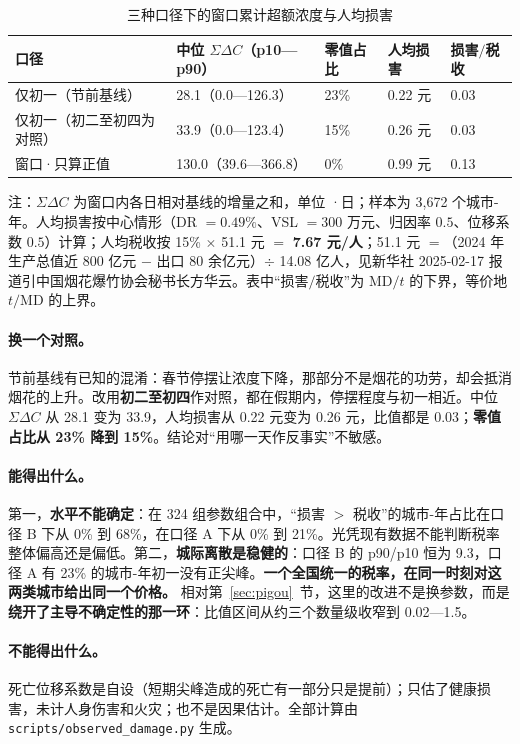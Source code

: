 \begin{table}[H]
\centering
\caption{三种口径下的窗口累计超额浓度与人均损害}
\label{tab:observed}
\small
\begin{tabular}{L{3.0cm}R{4.0cm}R{1.8cm}R{2.0cm}R{2.0cm}}
\toprule
\textbf{口径} & \textbf{中位 $\Sigma\Delta C$（p10—p90）} & \textbf{零值占比} & \textbf{人均损害} & \textbf{损害$/$税收} \\
\midrule
仅初一（节前基线） & 28.1（0.0—126.3） & 23\% & 0.22 元 & 0.03 \\
仅初一（初二至初四为对照） & 33.9（0.0—123.4） & 15\% & 0.26 元 & 0.03 \\
窗口·只算正值 & 130.0（39.6—366.8） & 0\% & 0.99 元 & 0.13 \\
\bottomrule
\end{tabular}

\vspace{0.3em}
{\small 注：$\Sigma\Delta C$ 为窗口内各日相对基线的增量之和，单位 \ugm{}·日；样本为 3,672 个城市-年。人均损害按中心情形（DR $=0.49\%$、VSL $=300$ 万元、归因率 $0.5$、位移系数 $0.5$）计算；人均税收按 15\% $\times$ 51.1 元 $=$ \textbf{7.67 元/人}；51.1 元 $=$（2024 年生产总值近 800 亿元 $-$ 出口 80 余亿元）$\div$ 14.08 亿人，见新华社 2025-02-17 报道引中国烟花爆竹协会秘书长方华云。表中“损害$/$税收”为 $\mathrm{MD}/t$ 的下界，等价地 $t/\mathrm{MD}$ 的上界。}
\end{table}

\paragraph{换一个对照。} 节前基线有已知的混淆：春节停摆让浓度下降，那部分不是烟花的功劳，却会抵消烟花的上升。改用\textbf{初二至初四}作对照，都在假期内，停摆程度与初一相近。中位 $\Sigma\Delta C$ 从 28.1 变为 33.9，人均损害从 0.22 元变为 0.26 元，比值都是 0.03；\textbf{零值占比从 23\% 降到 15\%}。结论对“用哪一天作反事实”不敏感。

\paragraph{能得出什么。} 第一，\textbf{水平不能确定}：在 324 组参数组合中，“损害 $>$ 税收”的城市-年占比在口径 B 下从 0\% 到 68\%，在口径 A 下从 0\% 到 21\%。光凭现有数据不能判断税率整体偏高还是偏低。第二，\textbf{城际离散是稳健的}：口径 B 的 p90/p10 恒为 9.3，口径 A 有 23\% 的城市-年初一没有正尖峰。\textbf{一个全国统一的税率，在同一时刻对这两类城市给出同一个价格。} 相对第~\ref{sec:pigou}~节，这里的改进不是换参数，而是\textbf{绕开了主导不确定性的那一环}：比值区间从约三个数量级收窄到 0.02—1.5。

\paragraph{不能得出什么。} 死亡位移系数是自设（短期尖峰造成的死亡有一部分只是提前）；只估了健康损害，未计人身伤害和火灾；也不是因果估计。全部计算由 \texttt{scripts/observed\_damage.py} 生成。
